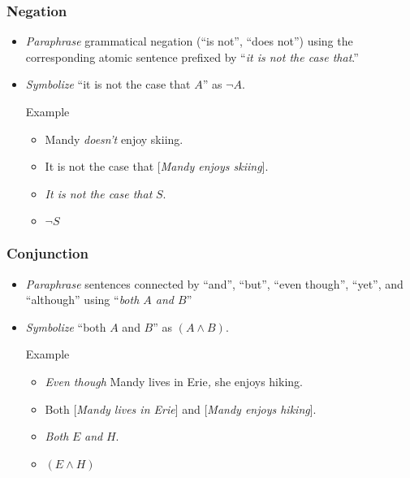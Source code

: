 \begin{frame}
  \frametitle{Negation}

  \begin{itemize}[<+->]
  \item \emph{Paraphrase} grammatical negation (``is not'', ``does not'') using the
  corresponding atomic sentence prefixed by ``\emph{it is not the case that}.''

  \item \emph{Symbolize} ``it is not the case that $A$'' as
  \emph{$\lnot A$}.

  \begin{block}{Example}
    \begin{itemize}[<+->]
    \item[] Mandy \emph{doesn't} enjoy skiing.
    \item[] It is not the case that [\emph{Mandy enjoys skiing}].
    \item[] \emph{It is not the case that} $S$.
    \item[] $\lnot S$
    \end{itemize}
  \end{block}
  \end{itemize}
\end{frame}

\begin{frame}
  \frametitle{Conjunction}

  \begin{itemize}[<+->]
  \item \emph{Paraphrase} sentences connected by ``and'', ``but'', ``even
  though'', ``yet'', and ``although'' using
  ``\emph{both $A$ and $B$}''

  \item \emph{Symbolize} ``both $A$ and $B$'' as
  \emph{$(A \land B)$}.

  \begin{block}{Example}
  \begin{itemize}[<+->]
  \item[] \emph{Even though} Mandy lives in Erie\emph{,} she enjoys hiking.

  \item[] Both [\emph{Mandy lives in Erie}] and [\emph{Mandy enjoys hiking}].

  \item[] \emph{Both} $E$ \emph{and} $H$.

  \item[] $(E \land H)$
  \end{itemize} 
  \end{block}
\end{itemize}

\end{frame}

